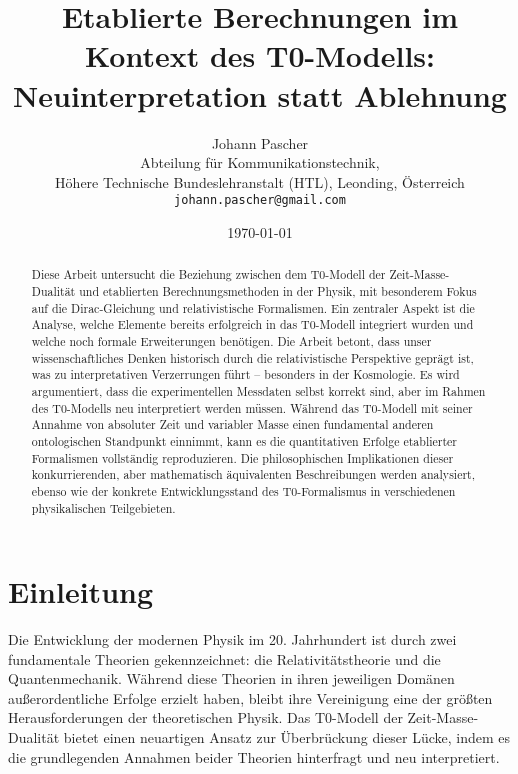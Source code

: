\documentclass[12pt,a4paper]{article}
\begin{document}
	
	\title{Etablierte Berechnungen im Kontext des T0-Modells:\\Neuinterpretation statt Ablehnung}
	\author{Johann Pascher\\
		Abteilung für Kommunikationstechnik, \\Höhere Technische Bundeslehranstalt (HTL), Leonding, Österreich\\
		\texttt{johann.pascher@gmail.com}}
	\date{\today}
	
	\maketitle
	
	\begin{abstract}
		Diese Arbeit untersucht die Beziehung zwischen dem T0-Modell der Zeit-Masse-Dualität und etablierten Berechnungsmethoden in der Physik, mit besonderem Fokus auf die Dirac-\hspace{0pt}Gleichung und relativistische Formalismen. Ein zentraler Aspekt ist die Analyse, welche Elemente bereits erfolgreich in das T0-Modell integriert wurden und welche noch formale Erweiterungen benötigen. Die Arbeit betont, dass unser wissenschaftliches Denken historisch durch die relativistische Perspektive geprägt ist, was zu interpretativen Verzerrungen führt – besonders in der Kosmologie. Es wird argumentiert, dass die experimentellen Messdaten selbst korrekt sind, aber im Rahmen des T0-Modells neu interpretiert werden müssen. Während das T0-Modell mit seiner Annahme von absoluter Zeit und variabler Masse einen fundamental anderen ontologischen Standpunkt einnimmt, kann es die quantitativen Erfolge etablierter Formalismen vollständig reproduzieren. Die philosophischen Implikationen dieser konkurrierenden, aber mathematisch äquivalenten Beschreibungen werden analysiert, ebenso wie der konkrete Entwicklungsstand des T0-\hspace{0pt}Formalismus in verschiedenen physikalischen Teilgebieten.
	\end{abstract}
	
	\tableofcontents
	\newpage
	
	\section{Einleitung}
	\label{sec:introduction}
	
	Die Entwicklung der modernen Physik im 20. Jahrhundert ist durch zwei fundamentale Theorien gekennzeichnet: die Relativitätstheorie und die Quantenmechanik. Während diese Theorien in ihren jeweiligen Domänen außerordentliche Erfolge erzielt haben, bleibt ihre Vereinigung eine der größten Herausforderungen der theoretischen Physik. Das T0-Modell der Zeit-Masse-Dualität bietet einen neuartigen Ansatz zur Überbrückung dieser Lücke, indem es die grundlegenden Annahmen beider Theorien hinterfragt und neu interpretiert.
	
\end{document}
